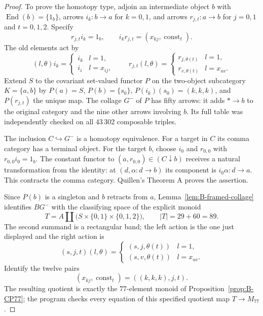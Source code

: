 \begin{proof}
To prove the homotopy type, adjoin an intermediate object $b$ with
$\operatorname{End}(b)=\{1_b\}$, arrows
$i_k:b\to a$ for $k=0,1$, and arrows
$r_{j,t}:a\to b$ for $j=0,1$ and $t=0,1,2$. Specify
\[
 r_{j,t}i_k=1_b,\qquad
 i_kr_{j,t}=(x_{kj},\operatorname{const}_t).
\]
The old elements act by
\[
 (l,\theta)i_k=
 \begin{cases}i_k&l=1,\\i_i&l=x_{ij},\end{cases}
 \qquad
 r_{j,t}(l,\theta)=
 \begin{cases}
 r_{j,\theta(t)}&l=1,\\
 r_{v,\theta(t)}&l=x_{uv}.
 \end{cases}
\]
Extend $S$ to the covariant set-valued functor $P$ on the
two-object subcategory $K=\{a,b\}$ by
$P(a)=S$, $P(b)=\{s_0\}$,
$P(i_k)(s_0)=(k,k,k)$, and $P(r_{j,t})$ the unique map.
The collage $G^-$ of $P$ has fifty arrows: it adds
$*\to b$ to the original category and the nine other arrows
involving $b$. Its full table was independently checked on all
43\,302 composable triples.

The inclusion $C\hookrightarrow G^-$ is a homotopy equivalence.
For a target in $C$ its comma category has a terminal object.
For the target $b$, choose $i_0$ and $r_{0,0}$ with
$r_{0,0}i_0=1_b$. The constant functor to
$(a,r_{0,0})\in(C\downarrow b)$ receives a natural transformation
from the identity: at $(d,\alpha:d\to b)$ its component is
$i_0\alpha:d\to a$. This contracts the comma category.
Quillen's Theorem A proves the assertion.

Since $P(b)$ is a singleton and $b$ retracts from $a$,
Lemma~\ref{lem:B-framed-collage} identifies $BG^-$ with the
classifying space of the explicit monoid
\[
 T=A\amalg\bigl(S\times\{0,1\}\times\{0,1,2\}\bigr),
 \qquad |T|=29+60=89.
\]
The second summand is a rectangular band; the left action is the
one just displayed and the right action is
\[
 (s,j,t)(l,\theta)=
 \begin{cases}
 (s,j,\theta(t))&l=1,\\
 (s,v,\theta(t))&l=x_{uv}.
 \end{cases}
\]
Identify the twelve pairs
\[
 (x_{kj},\operatorname{const}_t)=((k,k,k),j,t).
\]
The resulting quotient is exactly the 77-element monoid of
Proposition~\ref{prop:B-CP77}; the program checks every equation
of this specified quotient map $T\to M_{77}$.


\end{proof}
